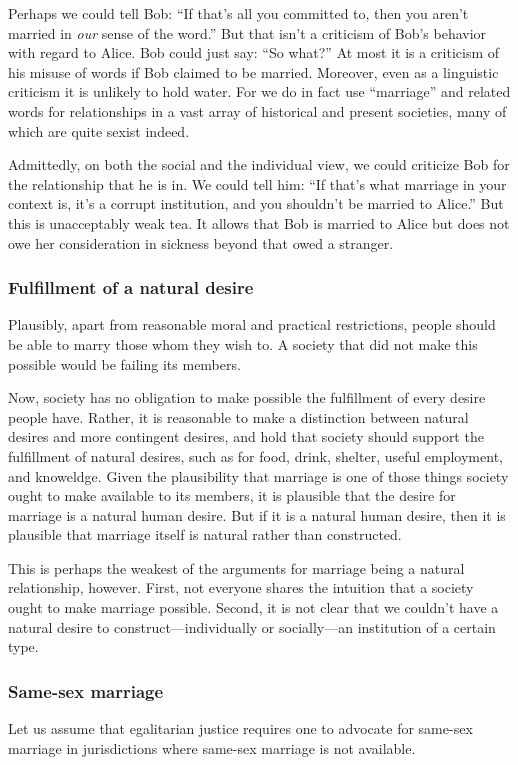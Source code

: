 Perhaps we could tell Bob: ``If that's all you committed to, then you aren't married in \textit{our} sense of the word.''
But that isn't a criticism of Bob's behavior with regard to Alice. Bob could just say: ``So what?'' At most it is a criticism of his misuse of words if Bob
claimed to be  married. Moreover, even as a linguistic criticism it is unlikely to hold water. For we do in fact use ``marriage'' and related words for relationships in
a vast array of historical and present societies, many of which are quite sexist indeed.

Admittedly, on both the social and the individual view, we could criticize Bob for the relationship that he is in. We could tell him: ``If that's what marriage
in your context is, it's a corrupt institution, and you shouldn't be married to Alice.'' But this is unacceptably weak tea. It allows that Bob is married to Alice but does
not owe her consideration in sickness beyond that owed a stranger.

\subsubsection{Fulfillment of a natural desire}
Plausibly, apart from reasonable moral and practical restrictions, people should be able to marry those whom they wish to. A society that did not make this
possible would be failing its members.

Now, society has no obligation to make possible the fulfillment of every desire people have. Rather, it is reasonable to make a distinction between natural
desires and more contingent desires, and hold that society should support the fulfillment of natural desires, such as for food, drink, shelter, useful
employment, and knoweldge. Given the plausibility that marriage is one of those things society ought to make available to its members, it is plausible that
the desire for marriage is a natural human desire. But if it is a natural human desire, then it is plausible that marriage itself is natural rather than
constructed.

This is perhaps the weakest of the arguments for marriage being a natural relationship, however. First, not everyone shares the intuition that a society ought
to make marriage possible. Second, it is not clear that we couldn't have a natural desire to construct---individually or socially---an institution of a certain
type.

\subsubsection{Same-sex marriage}
Let us assume that egalitarian justice requires one to advocate for same-sex marriage in jurisdictions where same-sex marriage is not available.

